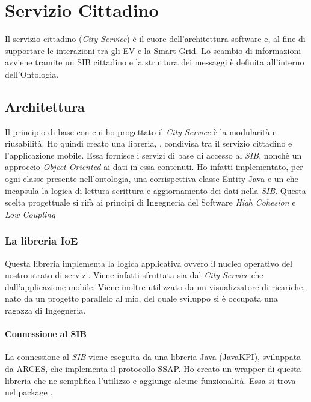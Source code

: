 \chapter{Servizio Cittadino}

Il servizio cittadino (\emph{City Service}) è il cuore dell'architettura software e, al fine di supportare le interazioni tra gli EV e la Smart Grid. Lo scambio di informazioni avviene tramite un SIB cittadino e la struttura dei messaggi è definita all'interno dell'Ontologia. 

\section{Architettura}

Il principio di base con cui ho progettato il \emph{City Service} è la modularità e riusabilità. Ho quindi creato una libreria, , condivisa tra il servizio cittadino e l'applicazione mobile. Essa fornisce i servizi di base di accesso al \emph{SIB}, nonchè un approccio \emph{Object Oriented} ai dati in essa contenuti. Ho infatti implementato, per ogni classe presente nell'ontologia, una corrispettiva classe Entity Java e un  che incapsula la logica di lettura scrittura e aggiornamento dei dati nella \emph{SIB}. Questa scelta progettuale si rifà ai principi di Ingegneria del Software \emph{High Cohesion} e \emph{Low Coupling} \cite{larcab2005}

\subsection{La libreria IoE}\label{subsec:ioe-lib}

Questa libreria implementa la logica applicativa ovvero il nucleo operativo del nostro strato di servizi. Viene infatti sfruttata sia dal \emph{City Service} che dall'applicazione mobile. Viene inoltre utilizzato da un visualizzatore di ricariche, nato da un progetto parallelo al mio, del quale sviluppo si è occupata una ragazza di Ingegneria.

\subsubsection{Connessione al SIB}

La connessione al \emph{SIB} viene eseguita da una libreria Java (JavaKPI), sviluppata da ARCES, che implementa il protocollo SSAP. Ho creato un wrapper di questa libreria che ne semplifica l'utilizzo e aggiunge alcune funzionalità. Essa si trova nel package .

